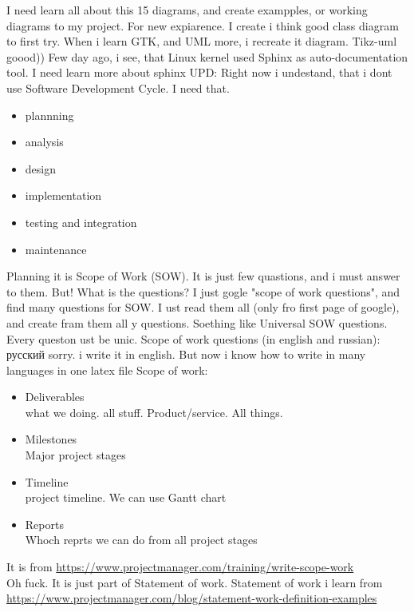 \documentclass{article}
\begin{document}
I need learn all about this 15 diagrams, and create exampples, or working diagrams to my project. For new expiarence.
I create i think good class diagram to first try. When i learn GTK, and UML more, i recreate it diagram. Tikz-uml goood))
Few day ago, i see, that Linux kernel used Sphinx as auto-documentation tool. I need learn more about sphinx
UPD: Right now i undestand, that i dont use Software Development Cycle. I need that.
\begin{itemize}
  \item plannning
  \item analysis
  \item design
  \item implementation
  \item testing and integration
  \item maintenance
\end{itemize}
Planning it is Scope of Work (SOW). It is just few quastions, and i must answer to them. But! What is the questions? I just gogle "scope of work questions", and find many questions for SOW. I ust read them all (only fro first page of google), and create fram them all y questions. Soething like Universal SOW questions. Every queston ust be unic.
Scope of work questions (in english and russian):
русский
sorry. i write it in english. But now i know how to write in many languages in one latex file
Scope of work:
\begin{itemize}
  \item Deliverables\\
    what we doing. all stuff. Product/service. All things.
  \item Milestones\\
    Major project stages
  \item Timeline\\
    project timeline. We can use Gantt chart
  \item Reports\\
    Whoch reprts we can do from all project stages
\end{itemize}
It is from \url{https://www.projectmanager.com/training/write-scope-work} \\
Oh fuck. It is just part of Statement of work. Statement of work i learn from \url{https://www.projectmanager.com/blog/statement-work-definition-examples}
\end{document}
